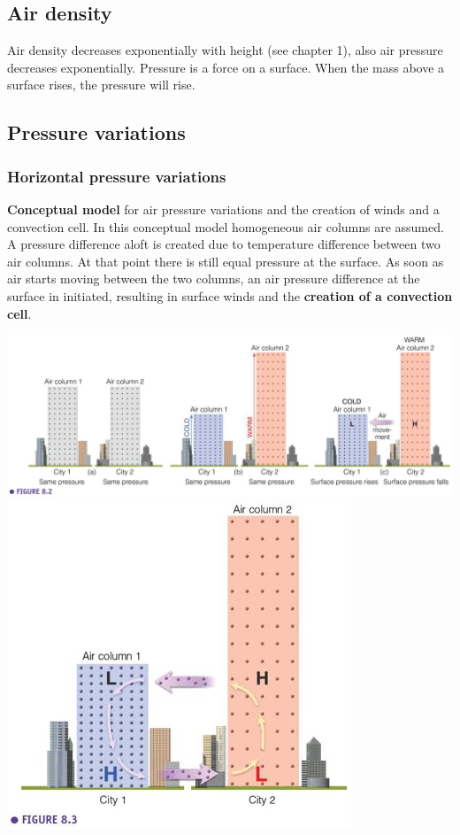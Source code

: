 \documentclass[oneside]{book}
\begin{document}
\subsection{Air density}\label{air-density}

Air density decreases exponentially with height (see chapter 1), also
air pressure decreases exponentially. Pressure is a force on a surface.
When the mass above a surface rises, the pressure will rise.

\subsection{Pressure variations}\label{pressure-variations}

\subsubsection{Horizontal pressure
variations}\label{horizontal-pressure-variations}

\textbf{Conceptual model} for air pressure variations and the creation
of winds and a convection cell. In this conceptual model homogeneous air
columns are assumed. A pressure difference aloft is created due to
temperature difference between two air columns. At that point there is
still equal pressure at the surface. As soon as air starts moving
between the two columns, an air pressure difference at the surface in
initiated, resulting in surface winds and the \textbf{creation of a
convection cell}.

\includegraphics{figures/Figure41a.png}
\includegraphics{figures/Figure41b.png}
\end{document}
